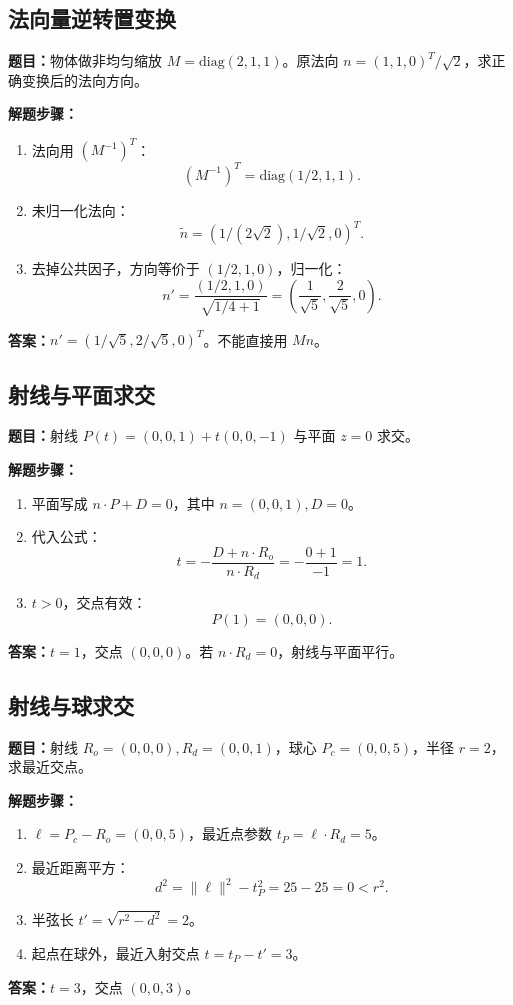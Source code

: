 \documentclass[UTF8,zihao=-4,scheme=chinese,fontset=fandol]{ctexart}
\begin{document}
\subsection{法向量逆转置变换}
\textbf{题目：}物体做非均匀缩放 $M=\mathrm{diag}(2,1,1)$。原法向 $n=(1,1,0)^T/\sqrt2$，求正确变换后的法向方向。

\textbf{解题步骤：}
\begin{enumerate}
  \item 法向用 $(M^{-1})^T$：
  \[
  (M^{-1})^T=\mathrm{diag}(1/2,1,1).
  \]
  \item 未归一化法向：
  \[
  \tilde n=(1/(2\sqrt2),1/\sqrt2,0)^T.
  \]
  \item 去掉公共因子，方向等价于 $(1/2,1,0)$，归一化：
  \[
  n'=\frac{(1/2,1,0)}{\sqrt{1/4+1}}=\left(\frac1{\sqrt5},\frac2{\sqrt5},0\right).
  \]
\end{enumerate}
\textbf{答案：}$n'=(1/\sqrt5,2/\sqrt5,0)^T$。不能直接用 $M n$。

\subsection{射线与平面求交}
\textbf{题目：}射线 $P(t)=(0,0,1)+t(0,0,-1)$ 与平面 $z=0$ 求交。

\textbf{解题步骤：}
\begin{enumerate}
  \item 平面写成 $n\cdot P+D=0$，其中 $n=(0,0,1),D=0$。
  \item 代入公式：
  \[
  t=-\frac{D+n\cdot R_o}{n\cdot R_d}=-\frac{0+1}{-1}=1.
  \]
  \item $t>0$，交点有效：
  \[
  P(1)=(0,0,0).
  \]
\end{enumerate}
\textbf{答案：}$t=1$，交点 $(0,0,0)$。若 $n\cdot R_d=0$，射线与平面平行。

\subsection{射线与球求交}
\textbf{题目：}射线 $R_o=(0,0,0),R_d=(0,0,1)$，球心 $P_c=(0,0,5)$，半径 $r=2$，求最近交点。

\textbf{解题步骤：}
\begin{enumerate}
  \item $\ell=P_c-R_o=(0,0,5)$，最近点参数 $t_P=\ell\cdot R_d=5$。
  \item 最近距离平方：
  \[
  d^2=\|\ell\|^2-t_P^2=25-25=0<r^2.
  \]
  \item 半弦长 $t'=\sqrt{r^2-d^2}=2$。
  \item 起点在球外，最近入射交点 $t=t_P-t'=3$。
\end{enumerate}
\textbf{答案：}$t=3$，交点 $(0,0,3)$。
\end{document}
